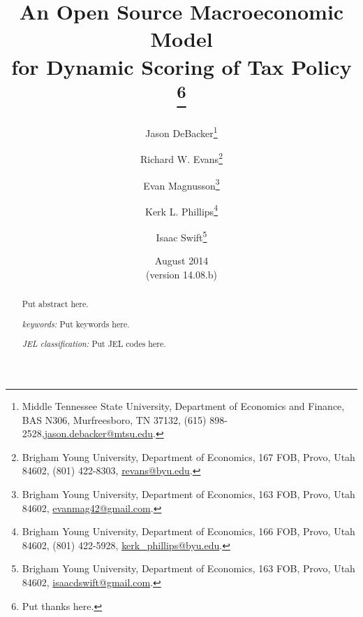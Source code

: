 \documentclass[letterpaper,12pt]{article}
\theoremstyle{definition}
\begin{document}
\begin{titlepage}
\title{An Open Source Macroeconomic Model \\
       for Dynamic Scoring of Tax Policy
       \thanks{
       Put thanks here.}
       }
\author{
  Jason DeBacker\footnote{Middle Tennessee State University, Department of Economics and Finance, BAS N306, Murfreesboro, TN 37132, (615) 898-2528,\href{mailto:jason.debacker@mtsu.edu}{jason.debacker@mtsu.edu}.} \\[-2pt]
  \and
  Richard W. Evans\footnote{Brigham Young University, Department of Economics, 167 FOB, Provo, Utah 84602, (801) 422-8303, \href{mailto:revans@byu.edu}{revans@byu.edu}.} \\[-2pt]
  \and
  Evan Magnusson\footnote{Brigham Young University, Department of Economics, 163 FOB, Provo, Utah 84602, \href{mailto:evanmag42@gmail.com}{evanmag42@gmail.com}.} \\[-2pt]
  \and
  Kerk L. Phillips\footnote{Brigham Young University, Department of Economics, 166 FOB, Provo, Utah 84602, (801) 422-5928, \href{mailto:kerk_phillips@byu.edu}{kerk\_phillips@byu.edu}.} \\[-2pt]
  \and
  Isaac Swift\footnote{Brigham Young University, Department of Economics, 163 FOB, Provo, Utah 84602, \href{mailto:isaacdswift@gmail.com}{isaacdswift@gmail.com}.} \\[-2pt]}
\date{August 2014 \\
  \scriptsize{(version 14.08.b)}}
\maketitle
\begin{abstract}
\normalsize{Put abstract here.

\vspace{3mm}

\noindent\textit{keywords:}\: Put keywords here.

\vspace{3mm}

\noindent\textit{JEL classification:} Put JEL codes here.}
\end{abstract}
\thispagestyle{empty}
\end{titlepage}
\end{document}
